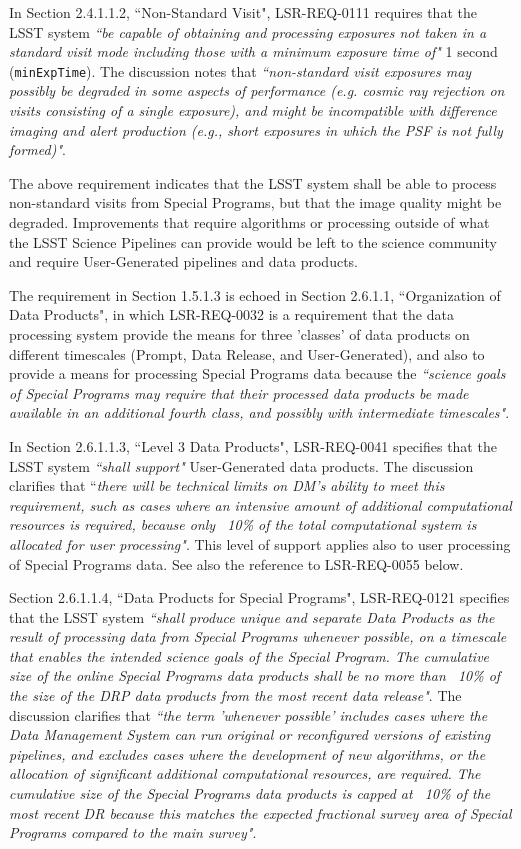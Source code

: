 In Section 2.4.1.1.2, ``Non-Standard Visit", LSR-REQ-0111 requires that the LSST system {\it ``be capable of obtaining and processing exposures not taken in a standard visit mode including those with a minimum exposure time of"} 1 second ({\tt minExpTime}).
The discussion notes that {\it ``non-standard visit exposures may possibly be degraded in some aspects of performance (e.g. cosmic ray rejection on visits consisting of a single exposure), and might be incompatible with difference imaging and alert production (e.g., short exposures in which the PSF is
not fully formed)"}.

The above requirement indicates that the LSST system shall be able to process non-standard visits from Special Programs, but that the image quality might be degraded.
Improvements that require algorithms or processing outside of what the LSST Science Pipelines can provide would be left to the science community and require User-Generated pipelines and data products.

The requirement in Section 1.5.1.3 is echoed in Section 2.6.1.1, ``Organization of Data Products", in which LSR-REQ-0032 is a requirement that the data processing system provide the means for three 'classes' of data products on different timescales (Prompt, Data Release, and User-Generated), and also to provide a means for processing Special Programs data because the {\it ``science goals of Special Programs may require that their processed data products be made available in an additional fourth class, and possibly with intermediate timescales"}.

In Section 2.6.1.1.3, ``Level 3 Data Products", LSR-REQ-0041 specifies that the LSST system {\it ``shall support"} User-Generated data products.
The discussion clarifies that ``{\it there will be technical limits on DM's ability to meet this requirement, such as cases where an intensive amount of additional computational resources is required, because only ~10\% of the total computational system is allocated for user processing"}.
This level of support applies also to user processing of Special Programs data.
See also the reference to LSR-REQ-0055 below.

Section 2.6.1.1.4, ``Data Products for Special Programs", LSR-REQ-0121 specifies that the LSST system {\it ``shall produce unique and separate Data Products as the result of processing data from Special Programs whenever possible, on a timescale that enables the intended science goals of the Special Program.
The cumulative size of the online Special Programs data products shall be no more than ~10\% of the size of the DRP data products from the most recent data
release"}.
The discussion clarifies that {\it ``the term 'whenever possible' includes cases where the Data Management System can run original or reconfigured versions of existing pipelines, and excludes cases where the development of new algorithms, or the allocation of significant additional computational resources, are required.
The cumulative size of the Special Programs data products is capped at ~10\% of the most recent DR because this matches the expected fractional survey area of Special Programs compared to the main survey"}.

